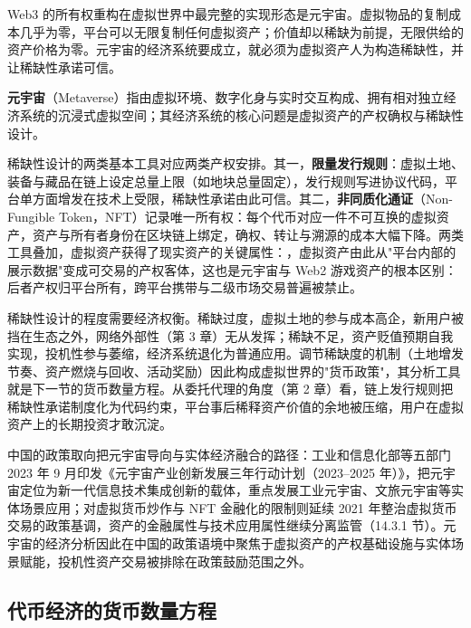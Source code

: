 Web3 的所有权重构在虚拟世界中最完整的实现形态是元宇宙。虚拟物品的复制成本几乎为零，平台可以无限复制任何虚拟资产；价值却以稀缺为前提，无限供给的资产价格为零。元宇宙的经济系统要成立，就必须为虚拟资产人为构造稀缺性，并让稀缺性承诺可信。

\begin{definition}
\textbf{元宇宙}（Metaverse）指由虚拟环境、数字化身与实时交互构成、拥有相对独立经济系统的沉浸式虚拟空间；其经济系统的核心问题是虚拟资产的产权确权与稀缺性设计。
\end{definition}

稀缺性设计的两类基本工具对应两类产权安排。其一，\textbf{限量发行规则}：虚拟土地、装备与藏品在链上设定总量上限（如地块总量固定），发行规则写进协议代码，平台单方面增发在技术上受限，稀缺性承诺由此可信。其二，\textbf{非同质化通证}（Non-Fungible Token，NFT）记录唯一所有权：每个代币对应一件不可互换的虚拟资产，资产与所有者身份在区块链上绑定，确权、转让与溯源的成本大幅下降。两类工具叠加，虚拟资产获得了现实资产的关键属性：，虚拟资产由此从"平台内部的展示数据"变成可交易的产权客体，这也是元宇宙与 Web2 游戏资产的根本区别：后者产权归平台所有，跨平台携带与二级市场交易普遍被禁止。

稀缺性设计的程度需要经济权衡。稀缺过度，虚拟土地的参与成本高企，新用户被挡在生态之外，网络外部性（第 3 章）无从发挥；稀缺不足，资产贬值预期自我实现，投机性参与萎缩，经济系统退化为普通应用。调节稀缺度的机制（土地增发节奏、资产燃烧与回收、活动奖励）因此构成虚拟世界的"货币政策"，其分析工具就是下一节的货币数量方程。从委托代理的角度（第 2 章）看，链上发行规则把稀缺性承诺制度化为代码约束，平台事后稀释资产价值的余地被压缩，用户在虚拟资产上的长期投资才敢沉淀。

中国的政策取向把元宇宙导向与实体经济融合的路径：工业和信息化部等五部门 2023 年 9 月印发《元宇宙产业创新发展三年行动计划（2023--2025 年）》，把元宇宙定位为新一代信息技术集成创新的载体，重点发展工业元宇宙、文旅元宇宙等实体场景应用；对虚拟货币炒作与 NFT 金融化的限制则延续 2021 年整治虚拟货币交易的政策基调，资产的金融属性与技术应用属性继续分离监管（14.3.1 节）。元宇宙的经济分析因此在中国的政策语境中聚焦于虚拟资产的产权基础设施与实体场景赋能，投机性资产交易被排除在政策鼓励范围之外。

\subsection{代币经济的货币数量方程}

